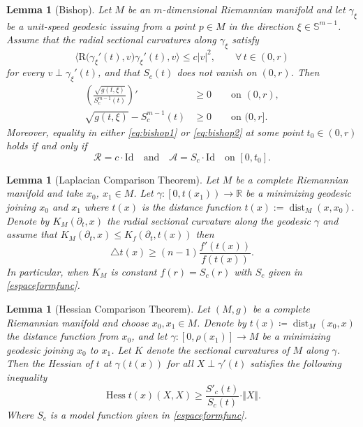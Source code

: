 \documentclass{article}
\newtheorem{lem}[thm]{Lemma}
\begin{document}
\begin{lem}[Bishop] \label{thm:bishop}
Let $M$ be an $m$-dimensional Riemannian manifold and let $\gamma_\xi$ be a unit-speed
geodesic issuing from a point $p\in M$ in the direction $\xi\in \mathbb{S}^{m-1}$.
Assume that the radial sectional curvatures along $\gamma_\xi$ satisfy
\[
\bigl\langle \mathrm{R}\bigl(\gamma_\xi'(t),v\bigr)\gamma_\xi'(t),v\bigr\rangle
\le c|v|^2,
\qquad \forall\, t\in(0,r)
\]
for every $v\perp \gamma_\xi'(t)$, and that $S_c(t)$ does not vanish on $(0,r)$.
Then
\begin{align}
\left(\frac{\sqrt{g(t,\xi)}}{S_c^{m-1}(t)}\right)' &\geq 0 
\qquad \text{on } (0,r), \label{eq:bishop1}\\
\sqrt{g(t,\xi)}-S_c^{m-1}(t) &\geq 0
\qquad \text{on } (0,r]. \label{eq:bishop2}
\end{align}
Moreover, equality in either \eqref{eq:bishop1} or \eqref{eq:bishop2} at some point
$t_0\in(0,r)$ holds if and only if
\[
\mathcal{R}=c \cdot \mathrm{Id}
\quad \text{and} \quad
\mathcal{A}=S_c \cdot \mathrm{Id}
\quad \text{on } [0,t_0].
\]
\end{lem}

\begin{lem}[Laplacian Comparison Theorem] Let $M$ be a complete Riemannian manifold and take $x_0$, $x_1 \in M$. Let $\gamma\colon\left[0, t(x_1)\right) \to \mathbb{R}$ be a minimizing geodesic joining $x_0$ and $x_1$ where $t(x)$ is the distance function $t(x):=\operatorname{dist}_{M}(x,x_0).$ Denote by  $K_M(\partial_t,x)$ the radial sectional curvature along the geodesic $\gamma$ and assume that $K_M(\partial_t,x) \leq K_f(\partial_t,t(x))$ then
\begin{equation*}
    \triangle t(x) \geq (n-1)\dfrac{f'(t(x))}{f(t(x))}. 
\end{equation*}
In particular, when $K_M$ is constant $f(r) = S_c(r)$ with $S_c$ given in \eqref{espaceformfunc}.
\end{lem}

\begin{lem}
[Hessian Comparison Theorem]\label{lem:hessian-comparison}
Let $(M,g)$ be a complete Riemannian manifold and choose $x_0,x_1\in M$. 
Denote by $t(x)\coloneqq \operatorname{dist}_M(x_0,x)$ the distance function from $x_0$, and let $\gamma\colon [0,\rho(x_1)]\to M$ be a minimizing geodesic joining $x_0$ to $x_1$. Let $K$ denote the sectional curvatures of $M$ along $\gamma$. Then the Hessian of $t$ at $\gamma(t(x))$ for all $X\perp \gamma'(t)$ satisfies the following inequality
\begin{equation*}
\operatorname{Hess} t(x)(X,X) \geq \frac{S'_c(t)}{S_c(t)} \cdot \Vert X \Vert .  \end{equation*} 
Where $S_c$ is a model function given in \eqref{espaceformfunc}.
  
\end{lem}
\end{document}

